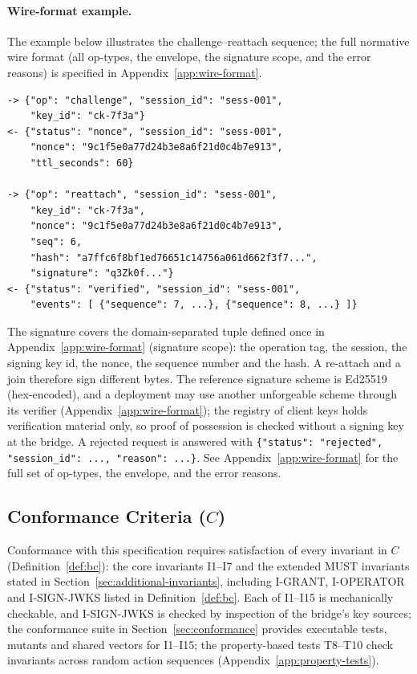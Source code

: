 \paragraph{Wire-format example.}

The example below illustrates the challenge--reattach sequence; the
full normative wire format (all op-types, the envelope, the
signature scope, and the error reasons) is specified in
Appendix~\ref{app:wire-format}.

\begin{lstlisting}
-> {"op": "challenge", "session_id": "sess-001",
    "key_id": "ck-7f3a"}
<- {"status": "nonce", "session_id": "sess-001",
    "nonce": "9c1f5e0a77d24b3e8a6f21d0c4b7e913",
    "ttl_seconds": 60}

-> {"op": "reattach", "session_id": "sess-001",
    "key_id": "ck-7f3a",
    "nonce": "9c1f5e0a77d24b3e8a6f21d0c4b7e913",
    "seq": 6,
    "hash": "a7ffc6f8bf1ed76651c14756a061d662f3f7...",
    "signature": "q3Zk0f..."}
<- {"status": "verified", "session_id": "sess-001",
    "events": [ {"sequence": 7, ...}, {"sequence": 8, ...} ]}
\end{lstlisting}

\noindent The signature covers the domain-separated tuple defined once in
Appendix~\ref{app:wire-format} (signature scope): the operation tag, the
session, the signing key id, the nonce, the sequence number and the hash.
A re-attach and a join therefore sign different bytes. The reference
signature scheme is Ed25519 (hex-encoded), and a deployment may use another
unforgeable scheme through its verifier
(Appendix~\ref{app:wire-format}); the registry of client keys holds verification
material only, so proof of possession is checked without a signing
key at the bridge. A rejected request is answered with
\texttt{\{"status": "rejected", "session\_id": ..., "reason": ...\}}.
See Appendix~\ref{app:wire-format} for the full set of op-types,
the envelope, and the error reasons.

\subsection{Conformance Criteria ($C$)}

Conformance with this specification requires satisfaction of every
invariant in $C$ (Definition~\ref{def:bc}): the core invariants
I1--I7 and the extended MUST invariants stated in
Section~\ref{sec:additional-invariants}, including I-GRANT, I-OPERATOR
and I-SIGN-JWKS listed in Definition~\ref{def:bc}. Each of I1--I15 is mechanically
checkable, and I-SIGN-JWKS is checked by inspection of the bridge's key
sources; the conformance suite in Section~\ref{sec:conformance}
provides executable tests, mutants and shared vectors for I1--I15;
the property-based tests T8--T10 check invariants across random action
sequences (Appendix~\ref{app:property-tests}).

